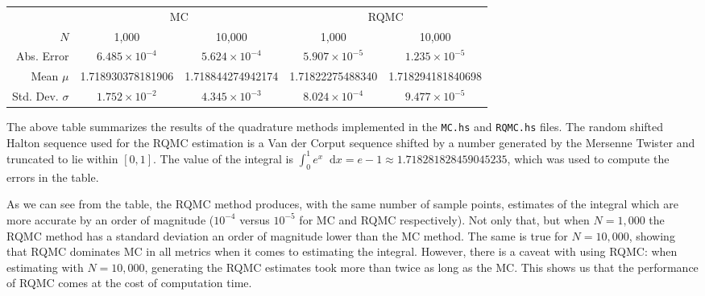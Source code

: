 \documentclass{article}
\newcommand*\diff{\mathop{}\!\mathrm{d}}
\begin{document}
\begin{enumerate}
        \newpage
        \begin{table}[]
            \centering
            \begin{tabular}{rcccc}
                \multicolumn{1}{l}{}                             & \multicolumn{2}{c}{MC}                        & \multicolumn{2}{c}{RQMC}           \\ \cline{2-5}
                \multicolumn{1}{r|}{$N$}                         & \multicolumn{1}{c|}{1,000} & \multicolumn{1}{c|}{10,000} & \multicolumn{1}{c|}{1,000} & \multicolumn{1}{c|}{10,000} \\ \cline{2-5} \cline{2-5}
                    \multicolumn{1}{r|}{Abs. Error}                       & \multicolumn{1}{c|}{$6.485 \times 10^{-4}$}      & \multicolumn{1}{c|}{$5.624 \times 10^{-4}$}       & \multicolumn{1}{c|}{$5.907 \times 10^{-5}$}      & \multicolumn{1}{c|}{$1.235 \times 10^{-5}$}       \\ \cline{2-5}
                \multicolumn{1}{r|}{Mean $\mu$}                  & \multicolumn{1}{c|}{1.718930378181906}      & \multicolumn{1}{c|}{1.718844274942174}       & \multicolumn{1}{c|}{1.71822275488340}      & \multicolumn{1}{c|}{1.718294181840698}       \\ \cline{2-5}
                \multicolumn{1}{r|}{Std. Dev. $\sigma$} & \multicolumn{1}{c|}{$1.752 \times 10^{-2}$}      & \multicolumn{1}{c|}{$4.345 \times 10^{-3}$}       & \multicolumn{1}{c|}{$8.024 \times 10^{-4}$}      & \multicolumn{1}{c|}{$9.477 \times 10^{-5}$}       \\ \cline{2-5}
            \end{tabular}
        \end{table}

        The above table summarizes the results of the quadrature methods implemented in the \texttt{MC.hs} and \texttt{RQMC.hs} files.
        The random shifted Halton sequence used for the RQMC estimation is a
        Van der Corput sequence shifted by a number generated by the Mersenne Twister and truncated to lie within $[0, 1]$.
        The value of the integral is $\int_{0}^{1}e^x\diff{x} = e - 1 \approx 1.718281828459045235$, which was used to compute the errors in the table.

        As we can see from the table, the RQMC method produces, with the same number of sample points,
        estimates of the integral which are more accurate by an order of magnitude ($10^{-4}$ versus $10^{-5}$ for MC and RQMC respectively).
        Not only that, but when $N = 1,000$ the RQMC method has a standard deviation an order of magnitude lower than the MC method.
        The same is true for $N = 10,000$, showing that RQMC dominates MC in all metrics when it comes to estimating the integral.
        However, there is a caveat with using RQMC: when estimating with $N = 10,000$, generating the RQMC estimates took more than twice as long as the MC.
        This shows us that the performance of RQMC comes at the cost of computation time.


\end{enumerate}
\end{document}

